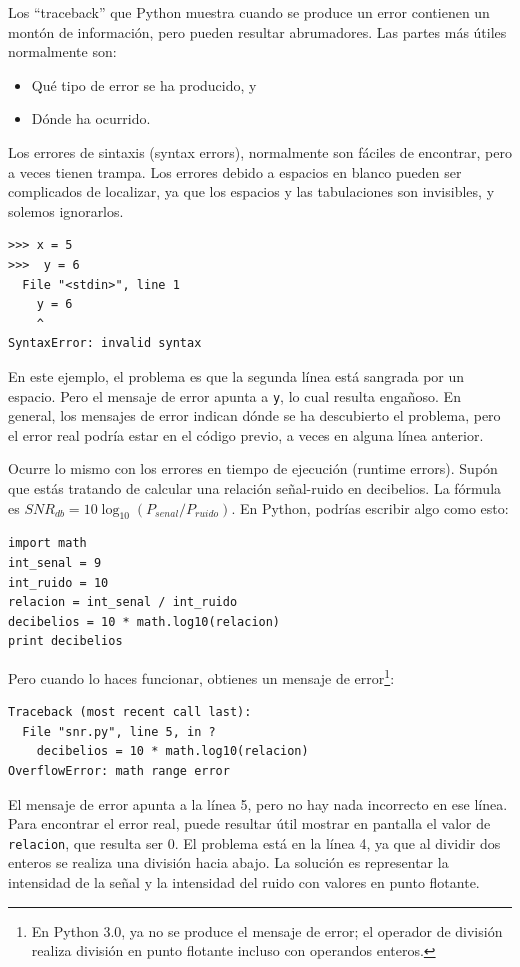 Los ``traceback'' que Python muestra cuando se produce un error contienen
un montón de información, pero pueden resultar abrumadores. Las partes
más útiles normalmente son:

\begin{itemize}

\item Qué tipo de error se ha producido, y

\item Dónde ha ocurrido.

\end{itemize}

Los errores de sintaxis (syntax errors), normalmente son fáciles de encontrar, pero
a veces tienen trampa. Los errores debido a espacios en blanco pueden ser complicados de
localizar, ya que los espacios y las tabulaciones son invisibles, y solemos ignorarlos.


\beforeverb
\begin{verbatim}
>>> x = 5
>>>  y = 6
  File "<stdin>", line 1
    y = 6
    ^
SyntaxError: invalid syntax
\end{verbatim}
\afterverb
%
En este ejemplo, el problema es que la segunda línea está sangrada por
un espacio. Pero el mensaje de error apunta a {\tt y}, lo cual
resulta engañoso. En general, los mensajes de error indican dónde se ha
descubierto el problema, pero el error real podría estar en el código
previo, a veces en alguna línea anterior.


Ocurre lo mismo con los errores en tiempo de ejecución (runtime errors). Supón que estás tratando
de calcular una relación señal-ruido en decibelios. La fórmula
es $SNR_{db} = 10 \log_{10} (P_{senal} / P_{ruido})$. En Python,
podrías escribir algo como esto:

\beforeverb
\begin{verbatim}
import math
int_senal = 9
int_ruido = 10
relacion = int_senal / int_ruido
decibelios = 10 * math.log10(relacion)
print decibelios
\end{verbatim}
\afterverb
%
Pero cuando lo haces funcionar, obtienes un mensaje de error\footnote{En Python 3.0,
ya no se produce el mensaje de error; el operador de división realiza
división en punto flotante incluso con operandos enteros.}:


\beforeverb
\begin{verbatim}
Traceback (most recent call last):
  File "snr.py", line 5, in ?
    decibelios = 10 * math.log10(relacion)
OverflowError: math range error
\end{verbatim}
\afterverb
%
El mensaje de error apunta a la línea 5, pero no hay nada
incorrecto en ese línea. Para encontrar el error real, puede resultar
útil mostrar en pantalla el valor de {\tt relacion}, que resulta ser
0. El problema está en la línea 4, ya que al dividir dos enteros
se realiza una división hacia abajo. La solución es representar la intensidad
de la señal y la intensidad del ruido con valores en punto flotante.

